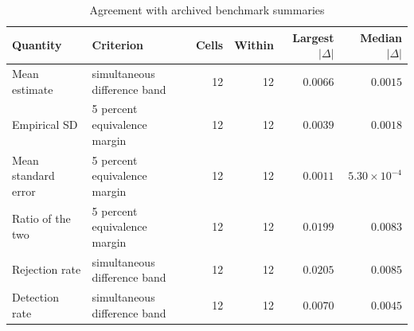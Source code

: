 \begin{table}[htbp]\centering
\caption{Agreement with archived benchmark summaries}
\label{tab:s6-fidelity}
{\scriptsize\setlength{\tabcolsep}{3pt}\begin{tabular}{llrrrr}
\toprule
Quantity & Criterion & Cells & Within & Largest $|\Delta|$ & Median $|\Delta|$ \\
\midrule
Mean estimate & simultaneous difference band & 12 & 12 & $0.0066$ & $0.0015$ \\
Empirical SD & 5 percent equivalence margin & 12 & 12 & $0.0039$ & $0.0018$ \\
Mean standard error & 5 percent equivalence margin & 12 & 12 & $0.0011$ & $5.30\times 10^{-4}$ \\
Ratio of the two & 5 percent equivalence margin & 12 & 12 & $0.0199$ & $0.0083$ \\
Rejection rate & simultaneous difference band & 12 & 12 & $0.0205$ & $0.0085$ \\
Detection rate & simultaneous difference band & 12 & 12 & $0.0070$ & $0.0045$ \\
\bottomrule
\end{tabular}}
\end{table}
